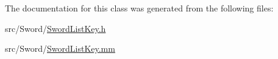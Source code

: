 The documentation for this class was generated from the following files\-:\begin{DoxyCompactItemize}
\item 
src/\-Sword/\hyperlink{_sword_list_key_8h}{Sword\-List\-Key.\-h}\item 
src/\-Sword/\hyperlink{_sword_list_key_8mm}{Sword\-List\-Key.\-mm}\end{DoxyCompactItemize}
